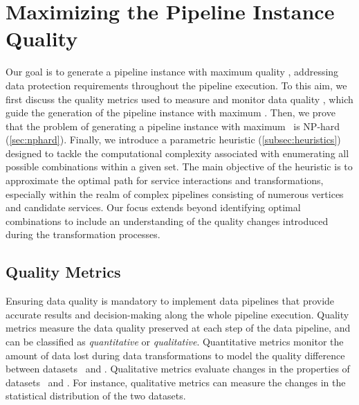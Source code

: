 \section{Maximizing the Pipeline Instance Quality}\label{sec:heuristics}
%
Our goal is to generate a pipeline instance with maximum quality \q, addressing data protection requirements throughout the pipeline execution. To this aim, we first discuss the quality metrics used to measure and monitor data quality \q, which guide the generation of the pipeline instance with maximum \q. Then, we prove that the problem of generating a pipeline instance with maximum \q\ is NP-hard (\cref{sec:nphard}). Finally, we introduce a parametric heuristic (\cref{subsec:heuristics}) designed to tackle the computational complexity associated with enumerating all possible combinations within a given set. The main objective of the heuristic is to approximate the optimal path for service interactions and transformations, especially within the realm of complex pipelines consisting of numerous vertices and candidate services. Our focus extends beyond identifying optimal combinations to include an understanding of the quality changes introduced during the transformation processes.


\subsection{Quality Metrics}\label{subsec:metrics}
Ensuring data quality is mandatory to implement data pipelines that provide accurate results and decision-making along the whole pipeline execution. Quality metrics measure the data quality preserved at each step of the data pipeline, and can be classified as \emph{quantitative} or \emph{qualitative}. %
Quantitative metrics monitor the amount of data lost during data transformations to model the quality difference between datasets \origdataset\ and \transdataset.
Qualitative metrics evaluate changes in the properties of datasets \origdataset\ and \transdataset. For instance, qualitative metrics can measure the changes in the statistical distribution of the two datasets.

